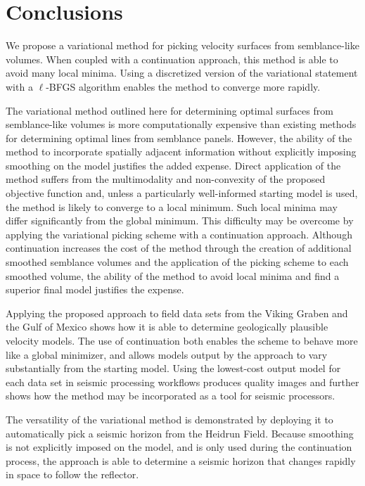 \section{Conclusions}
We propose a variational method for picking velocity surfaces from semblance-like volumes.  When coupled with a continuation approach, this method is able to avoid many local minima. Using a discretized version of the variational statement with a $\ell$-BFGS algorithm enables the method to converge more rapidly.

The variational method outlined here for determining optimal surfaces from semblance-like volumes is more computationally expensive than existing methods for determining optimal lines from semblance panels.  However, the ability of the method to incorporate spatially adjacent information without explicitly imposing smoothing on the model justifies the added expense.  Direct application of the method suffers from the multimodality and non-convexity of the proposed objective function and, unless a particularly well-informed starting model is used, the method is likely to converge to a local minimum.  Such local minima may differ significantly from the global minimum.  This difficulty may be overcome by applying the variational picking scheme with a continuation approach.
Although continuation increases the cost of the method through the creation of additional smoothed semblance volumes and the application of the picking scheme to each smoothed volume, the ability of the method to avoid local minima and find a superior final model justifies the expense. 

Applying the proposed approach to field data sets from the Viking Graben and the Gulf of Mexico shows how it is able to determine geologically plausible velocity models.  The use of continuation both enables the scheme to behave more like a global minimizer, and allows models output by the approach to vary substantially from the starting model.  Using the lowest-cost output model for each data set in seismic processing workflows produces quality images and further shows how the method may be incorporated as a tool for seismic processors.

The versatility of the variational method is demonstrated by deploying it to automatically pick a seismic horizon from the Heidrun Field. Because smoothing is not explicitly imposed on the model, and is only used during the continuation process, the approach is able to determine a seismic horizon that changes rapidly in space to follow the reflector.

